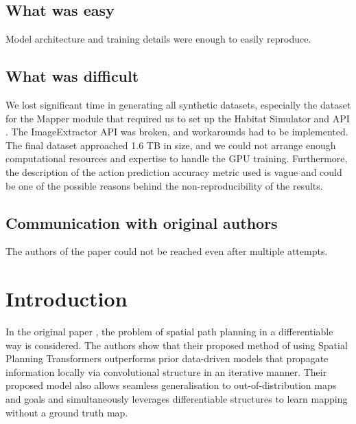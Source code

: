 \subsection*{What was easy}


Model architecture and training details were enough to easily reproduce.

\subsection*{What was difficult}

We lost significant time in generating all synthetic datasets, especially the dataset for the Mapper module that required us to set up the Habitat Simulator and API \cite{savva2019habitat}. The ImageExtractor API was broken, and workarounds had to be implemented. The final dataset approached 1.6 TB in size, and we could not arrange enough computational resources and expertise to handle the GPU training. Furthermore, the description of the action prediction accuracy metric used is vague and could be one of the possible reasons behind the non-reproducibility of the results.

\subsection*{Communication with original authors}

The authors of the paper could not be reached even after multiple attempts.
\newpage
\section{Introduction}
In the original paper \cite{chaplot2021differentiable}, the problem of spatial path planning in a differentiable way is considered. The authors show that their proposed method of using Spatial Planning Transformers outperforms prior data-driven models that propagate information locally via convolutional structure in an iterative manner. Their proposed model also allows seamless generalisation to out-of-distribution maps and goals and simultaneously leverages differentiable structures to learn mapping without a ground truth map. 

